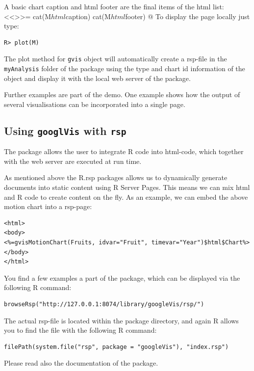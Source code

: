 A basic chart caption and html footer are the final items of the html list:
<<>>=
cat(M$html$caption)
cat(M$html$footer)
@ 
To display the page locally just type:
\begin{verbatim}
R> plot(M)
\end{verbatim}
The plot method for \texttt{gvis} object will automatically create a
rsp-file in the \texttt{myAnalysis} folder of the \googleVis package
using the type and chart id information of the object and display it
with the local web server of the \rsp package.

Further examples are part of the \googleVis demo. One
example shows how the output of several visualisations can
be incorporated into a single page.


\subsection{Using \texttt{googl{V}is} with \texttt{rsp}}\label{rspexample}
The \rsp package allows the user to integrate R code into html-code,
which together with the \rsp web server are executed at run time.

As mentioned above the R.rsp packages allows us to dynamically
generate documents into static content using R Server Pages. This
means we can mix html and R code to create content on the fly.   As an
example, we can embed the above motion chart into a rsp-page: 
\begin{verbatim}
<html>
<body>
<%=gvisMotionChart(Fruits, idvar="Fruit", timevar="Year")$html$Chart%>
</body>
</html>
\end{verbatim}
You find a few examples a part of the \googleVis package, which can be displayed
via the following R command:
\begin{verbatim}
browseRsp("http://127.0.0.1:8074/library/googleVis/rsp/")
\end{verbatim}
The actual rsp-file is located within the \googleVis package directory, and again R
allows you to find the file with the following R command: 
\begin{verbatim}
filePath(system.file("rsp", package = "googleVis"), "index.rsp")
\end{verbatim}
Please read also the documentation of the \rsp package.

\clearpage







